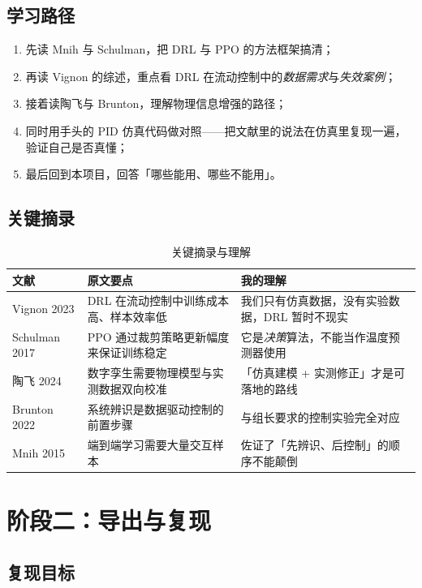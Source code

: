 \documentclass[stage1]{ydzjreport}
\begin{document}
\subsection{学习路径}

\begin{enumerate}
  \item 先读 Mnih 与 Schulman，把 DRL 与 PPO 的方法框架搞清；
  \item 再读 Vignon 的综述，重点看 DRL 在流动控制中的\emph{数据需求}与\emph{失效案例}；
  \item 接着读陶飞与 Brunton，理解物理信息增强的路径；
  \item 同时用手头的 PID 仿真代码做对照——把文献里的说法在仿真里复现一遍，验证自己是否真懂；
  \item 最后回到本项目，回答「哪些能用、哪些不能用」。
\end{enumerate}

\subsection{关键摘录}

\begin{table}[htbp]
\centering
\caption{关键摘录与理解}
\begin{tabularx}{\textwidth}{@{}Y Y Y@{}}
\toprule
{} 文献 & 原文要点 & 我的理解 \\
\midrule
Vignon 2023 & DRL 在流动控制中训练成本高、样本效率低 & 我们只有仿真数据，没有实验数据，DRL 暂时不现实 \\
Schulman 2017 & PPO 通过裁剪策略更新幅度来保证训练稳定 & 它是\emph{决策}算法，不能当作温度预测器使用 \\
陶飞 2024 & 数字孪生需要物理模型与实测数据双向校准 & 「仿真建模 + 实测修正」才是可落地的路线 \\
Brunton 2022 & 系统辨识是数据驱动控制的前置步骤 & 与组长要求的控制实验完全对应 \\
Mnih 2015 & 端到端学习需要大量交互样本 & 佐证了「先辨识、后控制」的顺序不能颠倒 \\
\bottomrule
\end{tabularx}
\end{table}

\section{阶段二：导出与复现}

\subsection{复现目标}
\end{document}
